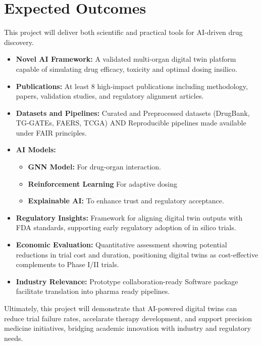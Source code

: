 \chapter*{Expected Outcomes}

This project will deliver both scientific and practical tools for AI-driven drug discovery.
\begin{itemize}
    \item \textbf{Novel AI Framework:} A validated multi-organ digital twin platform capable of simulating drug efficacy, toxicity and optimal dosing insilico.
    \item \textbf{Publications:} At least 8 high-impact publications including methodology, papers, validation studies, and regulatory alignment articles.
    \item \textbf{Datasets and Pipelines:} Curated and Preprocessed datasets (DrugBank, TG-GATEs, FAERS, TCGA) AND Reproducible pipelines made available under FAIR principles.
    \item \textbf{AI Models:} 
        \begin{itemize}
            \item \textbf{GNN Model:} For drug-organ interaction.
            \item \textbf{Reinforcement Learning} For adaptive dosing
            \item \textbf{Explainable AI:} To enhance trust and regulatory acceptance.
        \end{itemize}
    \item \textbf{Regulatory Insights:} Framework for aligning digital twin outputs with FDA standards, supporting early regulatory adoption of in silico trials.
    \item \textbf{Economic Evaluation:} Quantitative assessment showing potential reductions in trial cost and duration, positioning digital twins as cost-effective complements to Phase I/II trials.
    \item \textbf{Industry Relevance:} Prototype collaboration-ready Software package facilitate translation  into pharma ready pipelines.     
\end{itemize}

Ultimately, this project will demonstrate that AI-powered digital twins can reduce trial failure rates, accelarate therapy development, and support precision medicine initiatives, bridging academic innovation with
industry and regulatory needs. 